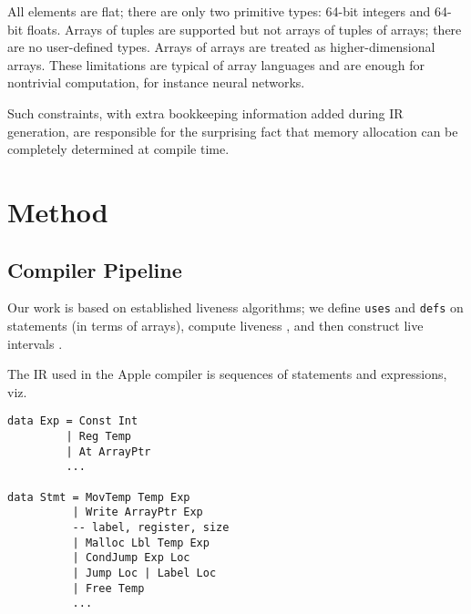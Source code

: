 \documentclass[sigplan,screen,anonymous]{acmart}
\begin{document}
All elements are flat; there are only two primitive types: 64-bit integers and 64-bit floats. Arrays of tuples are supported but not arrays of tuples of arrays; there are no user-defined types. Arrays of arrays are treated as higher-dimensional arrays. These limitations are typical of array languages and are enough for nontrivial computation, for instance neural networks.

Such constraints, with extra bookkeeping information added during IR generation, are responsible for the surprising fact that memory allocation can be completely determined at compile time.

\section{Method}

\subsection{Compiler Pipeline}

Our work is based on established liveness algorithms; we define {\tt uses} and {\tt defs} on statements (in terms of arrays), compute liveness \cite[pp.~213-216]{appel1998}, and then construct live intervals \cite{poletto1999}.



The IR used in the Apple compiler is sequences of statements and expressions, viz.

\begin{verbatim}
data Exp = Const Int
         | Reg Temp
         | At ArrayPtr
         ...

data Stmt = MovTemp Temp Exp
          | Write ArrayPtr Exp
          -- label, register, size
          | Malloc Lbl Temp Exp
          | CondJump Exp Loc
          | Jump Loc | Label Loc
          | Free Temp
          ...
\end{verbatim}
\end{document}
